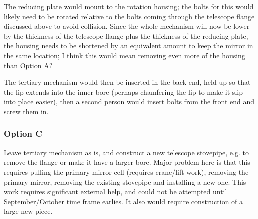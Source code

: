 \documentclass{article}
\begin{document}
The reducing plate would mount to the rotation housing; the bolts
for this would likely need to be rotated relative to the bolts
coming through the telescope flange discussed above to avoid
collision. Since the whole mechanism will now be lower by the
thickness of the telescope flange plus the thickness of the reducing
plate, the housing needs to be shortened by an equivalent amount
to keep the mirror in the same location; I think this would mean
removing even more of the housing than Option A?

The tertiary mechanism would then be inserted in the back end, held
up so that the lip extends into the inner bore (perhaps chamfering
the lip to make it slip into place easier), then a second person
would insert bolts from the front end and screw them in.

\subsubsection{Option C}
 Leave tertiary mechanism as is, and construct a new telescope 
stovepipe, e.g. to remove the flange or make it have a larger bore.
Major problem here is that this requires pulling the primary mirror cell
(requires crane/lift work), removing the primary mirror, removing
the existing stovepipe and installing a new one. This work requires
significant external help, and could not be attempted until September/October
time frame earlies. It also would require construction of a large new
piece.
 
\end{document}
